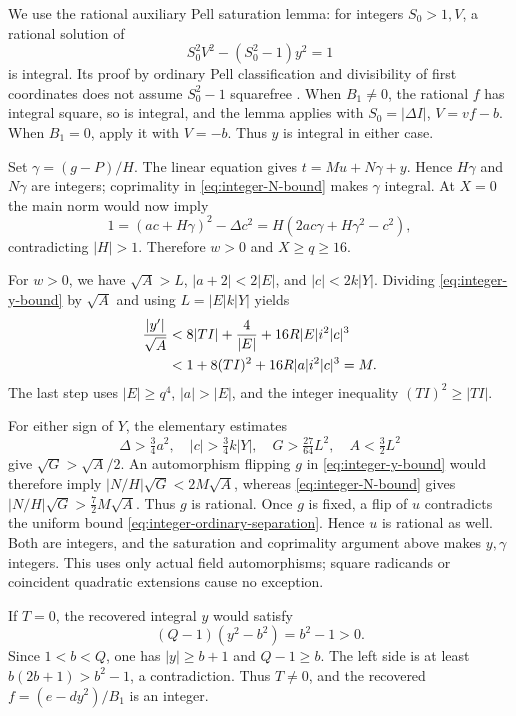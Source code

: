 \documentclass[11pt,letterpaper]{article}
\theoremstyle{remark}
\begin{document}
We use the rational auxiliary Pell saturation lemma: for integers
$S_0>1,V$, a rational solution of
\begin{equation}\label{eq:integer-saturation}
 S_0^2V^2-(S_0^2-1)y^2=1
\end{equation}
is integral. Its proof by ordinary Pell classification and divisibility
of first coordinates does not assume $S_0^2-1$ squarefree
\cite{repo19}. When $B_1\ne0$, the rational $f$ has integral square,
so is integral, and the lemma applies with
$S_0=|\Delta I|$, $V=vf-b$. When $B_1=0$, apply it with $V=-b$.
Thus $y$ is integral in either case.

Set $\gamma=(g-P)/H$. The linear equation gives
$t=Mu+N\gamma+y$. Hence $H\gamma$ and $N\gamma$ are integers;
coprimality in \eqref{eq:integer-N-bound} makes $\gamma$ integral.
At $X=0$ the main norm would now imply
\[
 1=(ac+H\gamma)^2-\Delta c^2
   =H(2ac\gamma+H\gamma^2-c^2),
\]
contradicting $|H|>1$. Therefore $w>0$ and $X\geq q\geq16$.

For $w>0$, we have $\sqrt A>L$, $|a+2|<2|E|$, and
$|c|<2k|Y|$. Dividing \eqref{eq:integer-y-bound} by $\sqrt A$
and using $L=|E|k|Y|$ yields
\begin{align}
 \frac{|y'|}{\sqrt A}
 &<8|TI|+\frac4{|E|}+16R|E|i^2|c|^3\notag\\
 &<1+8(TI)^2+16R|a|i^2|c|^3=M.
 \label{eq:integer-ordinary-separation}
\end{align}
The last step uses $|E|\geq q^4$, $|a|>|E|$, and the integer
inequality $(TI)^2\geq|TI|$.

For either sign of $Y$, the elementary estimates
\[
 \Delta>\tfrac34a^2,\quad |c|>\tfrac34k|Y|,
 \quad G>\tfrac{27}{64}L^2,\quad A<\tfrac32L^2
\]
give $\sqrt G>\sqrt A/2$. An automorphism flipping $g$ in
\eqref{eq:integer-y-bound} would therefore imply
$|N/H|\sqrt G<2M\sqrt A$, whereas
\eqref{eq:integer-N-bound} gives
$|N/H|\sqrt G>\tfrac72M\sqrt A$. Thus $g$ is rational. Once $g$
is fixed, a flip of $u$ contradicts the uniform bound
\eqref{eq:integer-ordinary-separation}. Hence $u$ is rational as well.
Both are integers, and the saturation and coprimality argument above
makes $y,\gamma$ integers. This uses only actual field automorphisms;
square radicands or coincident quadratic extensions cause no exception.

If $T=0$, the recovered integral $y$ would satisfy
\[
 (Q-1)(y^2-b^2)=b^2-1>0.
\]
Since $1<b<Q$, one has $|y|\geq b+1$ and $Q-1\geq b$. The left
side is at least $b(2b+1)>b^2-1$, a contradiction. Thus $T\ne0$,
and the recovered $f=(e-dy^2)/B_1$ is an integer.
\end{document}
